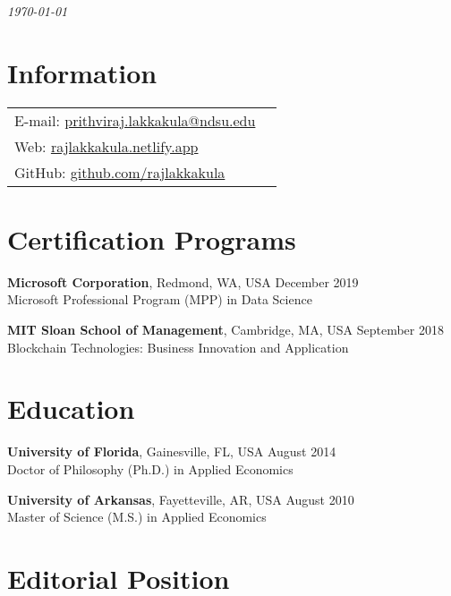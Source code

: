 \documentclass[margin,line]{res}
\begin{document}
 \hfill{\em \today}

\begin{resume}

\section{\sc Information}

\vspace{.05in}
\begin{tabular}{@{}p{3.5in}p{3in}}

{E-mail:} \href{mailto:prithviraj.lakkakula@ndsu.edu}{prithviraj.lakkakula@ndsu.edu}\\
{Web:} \href{https://rajlakkakula.netlify.app/}{rajlakkakula.netlify.app}\\
{GitHub:} \href{https://github.com/rajlakkakula}{github.com/rajlakkakula}
\end{tabular}

\section{\sc Certification Programs}
{\bf Microsoft Corporation}, Redmond, WA, USA  \hfill December 2019\\
Microsoft Professional Program (MPP) in Data Science \hfill

{\bf MIT Sloan School of Management}, Cambridge, MA, USA \hfill September 2018\\
Blockchain Technologies: Business Innovation and Application \hfill

\section{\sc Education}

{\bf University of Florida}, Gainesville, FL, USA \hfill August 2014\\
Doctor of Philosophy (Ph.D.) in Applied Economics \hfill


{\bf University of Arkansas}, Fayetteville, AR, USA \hfill August 2010 \\
Master of Science (M.S.) in Applied Economics \hfill %

\section{\sc Editorial Position}



\end{resume}
\end{document}

